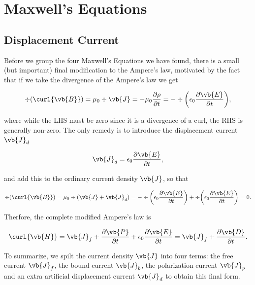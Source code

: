 \documentclass[english,a4paper,12pt]{report}
\begin{document}
\section{Maxwell's Equations}

\subsection{Displacement Current} \label{displacement} 

Before we group the four Maxwell's Equations we have found, there is a small (but important) final modification to the Ampere's law, motivated by the fact that if we take the divergence of the Ampere's law we get

\begin{equation}
    \div{(\curl{\vb{B} } )} = \mu_0 \div{\vb{J} } = -\mu_0 \frac{\partial \rho }{\partial t} = -\div{\left( \epsilon_0 \frac{\partial \vb{E} }{\partial t}  \right)}, 
\end{equation}

where while the LHS must be zero since it is a divergence of a curl, the RHS is generally non-zero. The only remedy is to introduce the displacement current \(\vb{J} _{d} \)

\begin{equation}
    \vb{J} _{d} = \epsilon_0 \frac{\partial \vb{E} }{\partial t}, 
\end{equation}

and add this to the ordinary current density \(\vb{J} \), so that 

\begin{equation}
    \div{(\curl{\vb{B} } )} = \mu_0 \div{(\vb{J} + \vb{J} _{d} )} = -\div{\left( \epsilon_0 \frac{\partial \vb{E} }{\partial t}  \right)} + \div{\left( \epsilon_0 \frac{\partial \vb{E} }{\partial t}  \right)} = 0. 
\end{equation}

Therfore, the complete modified Ampere's law is 

\begin{equation}
    \curl{\vb{H} } = \vb{J}_{f} + \frac{\partial \vb{P} }{\partial t} + \epsilon_0 \frac{\partial \vb{E} }{\partial t} = \vb{J} _{f} + \frac{\partial \vb{D} }{\partial t}.      
\end{equation}

To summarize, we spilt the current density \(\vb{J} \) into four terms: the free current \(\vb{J} _{f} \), the bound current \(\vb{J} _{b} \), the polarization current \(\vb{J} _{p} \) and an extra artificial displacement current \(\vb{J} _{d} \) to obtain this final form.     
\end{document}
